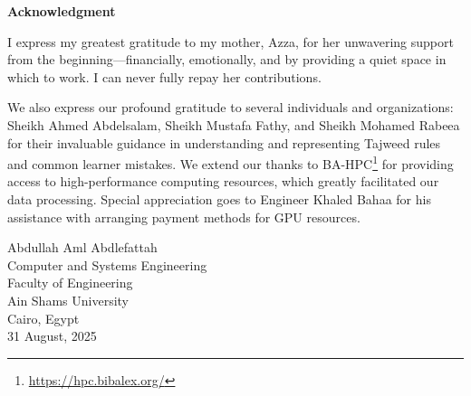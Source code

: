 \cleardoublepage
\newpage
\thispagestyle{empty}
{}

\begin{center}\huge \textbf{Acknowledgment}\end{center}

I express my greatest gratitude to my mother, Azza, for her unwavering support from the beginning---financially, emotionally, and by providing a quiet space in which to work. I can never fully repay her contributions.

We also express our profound gratitude to several individuals and organizations: Sheikh Ahmed Abdelsalam, Sheikh Mustafa Fathy, and Sheikh Mohamed Rabeea for their invaluable guidance in understanding and representing Tajweed rules and common learner mistakes. We extend our thanks to BA-HPC\footnote{\url{https://hpc.bibalex.org/}} for providing access to high-performance computing resources, which greatly facilitated our data processing. Special appreciation goes to Engineer Khaled Bahaa for his assistance with arranging payment methods for GPU resources.





\vfill
\begin{flushright}
\large
Abdullah Aml Abdlefattah\\
Computer and Systems Engineering\\
Faculty of Engineering\\
Ain Shams University\\
Cairo, Egypt\\
31 August, 2025
\end{flushright}





